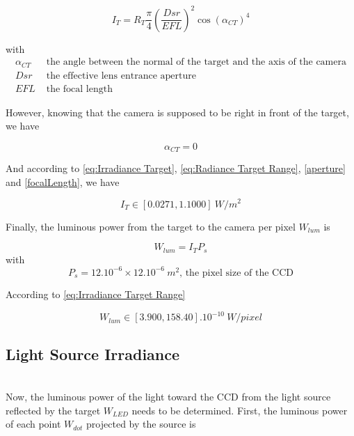 \begin{equation}
\label{eq:Irradiance Target}
I_T = R_T\frac{\pi}{4}\left(\frac{Dsr}{EFL}\right)^2\cos (\alpha_{CT})^4
\end{equation}

with
\begin{align*}
\alpha_{CT} & \mbox{ the angle between the normal of the target and the axis of the camera} \\
Dsr & \mbox{ the effective lens entrance aperture} \\
EFL & \mbox{ the focal length}
\end{align*}

However, knowing that the camera is supposed to be right in front of the target, we have

\begin{equation*}
\alpha_{CT} = 0
\end{equation*}

And according to \eqref{eq:Irradiance Target}, \eqref{eq:Radiance Target Range}, \ref{aperture} and \ref{focalLength}, we have

\begin{equation}
\label{eq:Irradiance Target Range}
I_T \in [0.0271, 1.1000] \ W/m^2
\end{equation}

Finally, the luminous power from the target to the camera per pixel $W_{lum}$ is 

\begin{equation}
\label{eq:Luminous Power}
W_{lum} = I_TP_s
\end{equation}
with
\begin{equation*}
P_s = 12.10^{-6}\times 12.10^{-6}\ m^2\mbox{, the pixel size of the CCD}
\end{equation*}

According to \eqref{eq:Irradiance Target Range}

\begin{equation}
\label{eq:Luminous Power Range}
W_{lum} \in [3.900, 158.40].10^{-10} \ W/pixel
\end{equation}





\subsection{Light Source Irradiance}
~\\
Now, the luminous power of the light toward the CCD from the light source reflected by the target $W_{LED}$ needs to be determined. First, the luminous power of each point $W_{dot}$ projected by the source is

